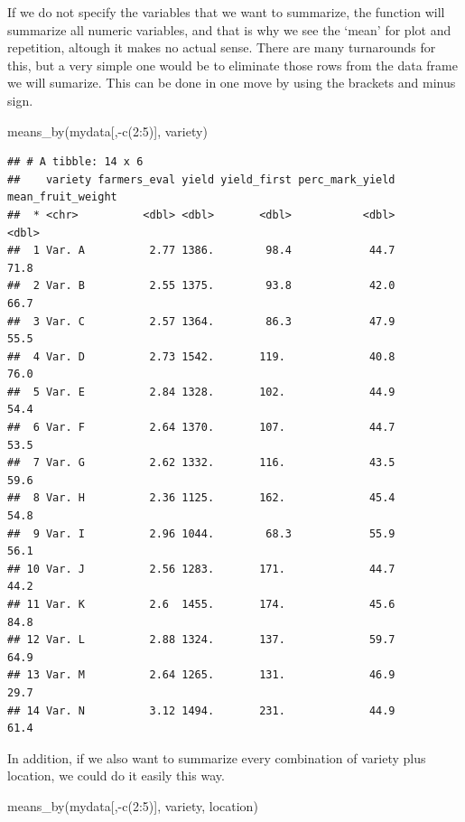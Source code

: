 \documentclass[
]{book}
\newenvironment{Shaded}{\begin{snugshade}}{\end{snugshade}}
\newcommand{\DecValTok}[1]{\textcolor[rgb]{0.00,0.00,0.81}{#1}}
\newcommand{\FunctionTok}[1]{\textcolor[rgb]{0.00,0.00,0.00}{#1}}
\newcommand{\NormalTok}[1]{#1}
\newcommand{\SpecialCharTok}[1]{\textcolor[rgb]{0.00,0.00,0.00}{#1}}
\begin{document}
If we do not specify the variables that we want to summarize, the function will summarize all numeric variables, and that is why we see the `mean' for plot and repetition, altough it makes no actual sense. There are many turnarounds for this, but a very simple one would be to eliminate those rows from the data frame we will sumarize. This can be done in one move by using the brackets and minus sign.

\begin{Shaded}
\begin{Highlighting}[]
\FunctionTok{means\_by}\NormalTok{(mydata[,}\SpecialCharTok{{-}}\FunctionTok{c}\NormalTok{(}\DecValTok{2}\SpecialCharTok{:}\DecValTok{5}\NormalTok{)], variety)}
\end{Highlighting}
\end{Shaded}

\begin{verbatim}
## # A tibble: 14 x 6
##    variety farmers_eval yield yield_first perc_mark_yield mean_fruit_weight
##  * <chr>          <dbl> <dbl>       <dbl>           <dbl>             <dbl>
##  1 Var. A          2.77 1386.        98.4            44.7              71.8
##  2 Var. B          2.55 1375.        93.8            42.0              66.7
##  3 Var. C          2.57 1364.        86.3            47.9              55.5
##  4 Var. D          2.73 1542.       119.             40.8              76.0
##  5 Var. E          2.84 1328.       102.             44.9              54.4
##  6 Var. F          2.64 1370.       107.             44.7              53.5
##  7 Var. G          2.62 1332.       116.             43.5              59.6
##  8 Var. H          2.36 1125.       162.             45.4              54.8
##  9 Var. I          2.96 1044.        68.3            55.9              56.1
## 10 Var. J          2.56 1283.       171.             44.7              44.2
## 11 Var. K          2.6  1455.       174.             45.6              84.8
## 12 Var. L          2.88 1324.       137.             59.7              64.9
## 13 Var. M          2.64 1265.       131.             46.9              29.7
## 14 Var. N          3.12 1494.       231.             44.9              61.4
\end{verbatim}

In addition, if we also want to summarize every combination of variety plus location, we could do it easily this way.

\begin{Shaded}
\begin{Highlighting}[]
\FunctionTok{means\_by}\NormalTok{(mydata[,}\SpecialCharTok{{-}}\FunctionTok{c}\NormalTok{(}\DecValTok{2}\SpecialCharTok{:}\DecValTok{5}\NormalTok{)], variety, location)}
\end{Highlighting}
\end{Shaded}
\end{document}
